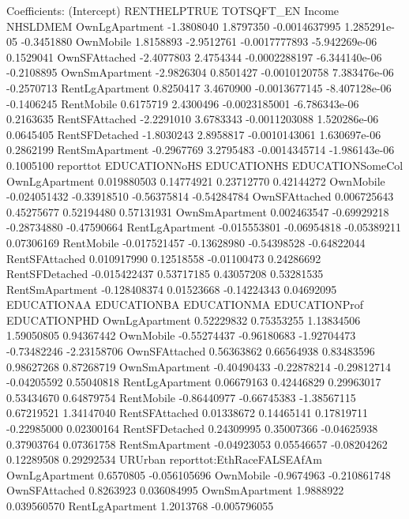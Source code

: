 \documentclass{article}
\begin{document}
\begin{Schunk}
\begin{Soutput}
Coefficients:
                (Intercept) RENTHELPTRUE    TOTSQFT_EN        Income   NHSLDMEM
OwnLgApartment   -1.3808040    1.8797350 -0.0014637995  1.285291e-05 -0.3451880
OwnMobile         1.8158893   -2.9512761 -0.0017777893 -5.942269e-06  0.1529041
OwnSFAttached    -2.4077803    2.4754344 -0.0002288197 -6.344140e-06 -0.2108895
OwnSmApartment   -2.9826304    0.8501427 -0.0010120758  7.383476e-06 -0.2570713
RentLgApartment   0.8250417    3.4670900 -0.0013677145 -8.407128e-06 -0.1406245
RentMobile        0.6175719    2.4300496 -0.0023185001 -6.786343e-06  0.2163635
RentSFAttached   -2.2291010    3.6783343 -0.0011203088  1.520286e-06  0.0645405
RentSFDetached   -1.8030243    2.8958817 -0.0010143061  1.630697e-06  0.2862199
RentSmApartment  -0.2967769    3.2795483 -0.0014345714 -1.986143e-06  0.1005100
                   reporttot EDUCATIONNoHS EDUCATIONHS EDUCATIONSomeCol
OwnLgApartment   0.019880503    0.14774921  0.23712770       0.42144272
OwnMobile       -0.024051432   -0.33918510 -0.56375814      -0.54284784
OwnSFAttached    0.006725643    0.45275677  0.52194480       0.57131931
OwnSmApartment   0.002463547   -0.69929218 -0.28734880      -0.47590664
RentLgApartment -0.015553801   -0.06954818 -0.05389211       0.07306169
RentMobile      -0.017521457   -0.13628980 -0.54398528      -0.64822044
RentSFAttached   0.010917990    0.12518558 -0.01100473       0.24286692
RentSFDetached  -0.015422437    0.53717185  0.43057208       0.53281535
RentSmApartment -0.128408374    0.01523668 -0.14224343       0.04692095
                EDUCATIONAA EDUCATIONBA EDUCATIONMA EDUCATIONProf EDUCATIONPHD
OwnLgApartment   0.52229832  0.75353255  1.13834506    1.59050805   0.94367442
OwnMobile       -0.55274437 -0.96180683 -1.92704473   -0.73482246  -2.23158706
OwnSFAttached    0.56363862  0.66564938  0.83483596    0.98627268   0.87268719
OwnSmApartment  -0.40490433 -0.22878214 -0.29812714   -0.04205592   0.55040818
RentLgApartment  0.06679163  0.42446829  0.29963017    0.53434670   0.64879754
RentMobile      -0.86440977 -0.66745383 -1.38567115    0.67219521   1.34147040
RentSFAttached   0.01338672  0.14465141  0.17819711   -0.22985000   0.02300164
RentSFDetached   0.24309995  0.35007366 -0.04625938    0.37903764   0.07361758
RentSmApartment -0.04923053  0.05546657 -0.08204262    0.12289508   0.29292534
                   URUrban reporttot:EthRaceFALSEAfAm
OwnLgApartment   0.6570805               -0.056105696
OwnMobile       -0.9674963               -0.210861748
OwnSFAttached    0.8263923                0.036084995
OwnSmApartment   1.9888922                0.039560570
RentLgApartment  1.2013768               -0.005796055

\end{Soutput}
\end{Schunk}
\end{document}
